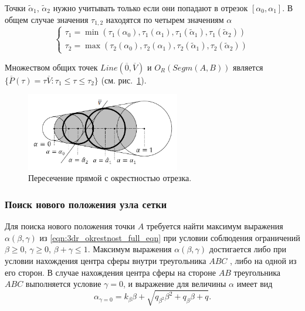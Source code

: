 Точки $\tilde{\alpha}_1$, $\tilde{\alpha}_2$ нужно учитывать только если они попадают в отрезок $[\alpha_0, \alpha_1]$.
В общем случае значения $\tau_{1,2}$ находятся по четырем значениям $\alpha$
\begin{equation}
	\left\{
		\begin{aligned}
			\tau_1 = \min(\tau_{1}(\alpha_0), \tau_{1}(\alpha_1), \tau_{1}(\tilde{\alpha}_1), \tau_{1}(\tilde{\alpha}_2)) \\
			\tau_2 = \max(\tau_{2}(\alpha_0), \tau_{2}(\alpha_1), \tau_{2}(\tilde{\alpha}_1), \tau_{2}(\tilde{\alpha}_2))
		\end{aligned}
	\right.
\end{equation}

Множеством общих точек $Line(\overline{0}, \overline{V})$ и $O_R(Segm(A, B))$ является $\{ \overline{P}(\tau) = \tau \overline{V}: \tau_1 \le \tau \le \tau_2 \}$ (см. рис.~\ref{fig:text_1_geo_prim_spheres_nest_intersection}).

\begin{figure}[ht]
\centering
\includegraphics[width=0.6\textwidth]{fig/3dr_spheres_nest_intersection.pdf}
\singlespacing
{}\caption{Пересечение прямой с окрестностью отрезка.}
\label{fig:text_1_geo_prim_spheres_nest_intersection}
\end{figure}

\subsubsection{Поиск нового положения узла сетки}

Для поиска нового положения точки $A$ требуется найти максимум выражения $\alpha(\beta,\gamma)$ из \eqref{eqn:3dr_okrestnost_full_eqn} при условии соблюдения ограничений $\beta \ge 0$, $\gamma \ge 0$, $\beta + \gamma \le 1$.
Максимум выражения $\alpha(\beta, \gamma)$ достигается либо при условии нахождения центра сферы внутри треугольника $ABC$ , либо на одной из его сторон.
В случае нахождения центра сферы на стороне $AB$ треугольника $ABC$ выполняется условие $\gamma = 0$, и выражение для величины $\alpha$ имеет вид
\begin{equation}
	\alpha_{\gamma = 0} = k_{\beta} \beta + \sqrt{q_{\beta^2} \beta^2 + q_{\beta} \beta + q}.
\end{equation}

